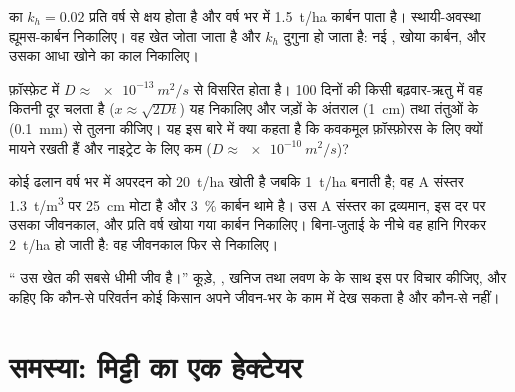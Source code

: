 \begin{exercise}[$\star\star$]\label{exo:b2:living-soil:9}
 का  $k_h = 0.02$ प्रति वर्ष से क्षय होता है और वर्ष भर में
\qty{1.5}{t/ha} कार्बन पाता है। स्थायी-अवस्था
ह्यूमस-कार्बन निकालिए। वह खेत जोता जाता है और $k_h$ दुगुना हो जाता है: नई
, खोया कार्बन, और उसका आधा खोने का काल निकालिए।
\end{exercise}

\begin{exercise}[$\star\star\star$]\label{exo:b2:living-soil:10}
फ़ॉस्फ़ेट  में $D \approx \qty{e-13}{m^2/s}$ से विसरित होता है।
\num{100} दिनों की किसी बढ़वार-ऋतु में वह कितनी दूर चलता है
($x \approx \sqrt{2Dt}$) यह निकालिए और जड़ों के अंतराल
(\qty{1}{cm}) तथा तंतुओं के (\qty{0.1}{mm}) से तुलना कीजिए। यह इस बारे में क्या कहता है
कि कवकमूल फ़ॉस्फ़ोरस के लिए क्यों मायने रखती हैं और नाइट्रेट के लिए कम
($D \approx \qty{e-10}{m^2/s}$)?
\end{exercise}

\begin{exercise}[$\star\star\star$]\label{exo:b2:living-soil:11}
कोई ढलान वर्ष भर में अपरदन को \qty{20}{t/ha}  खोती है जबकि
\qty{1}{t/ha} बनाती है; वह A संस्तर \qty{1.3}{t/m^3} पर \qty{25}{cm} मोटा है
और \qty{3}{\%} कार्बन थामे है। उस A
संस्तर का द्रव्यमान, इस दर पर उसका जीवनकाल, और प्रति वर्ष खोया गया
कार्बन निकालिए। बिना-जुताई के नीचे वह हानि गिरकर \qty{2}{t/ha} हो जाती है: वह
जीवनकाल फिर से निकालिए।
\end{exercise}

\begin{exercise}[$\star\star\star$]\label{exo:b2:living-soil:12}
`` उस खेत की सबसे धीमी जीव है।'' कूड़े, , खनिज 
तथा लवण के  के साथ इस पर विचार कीजिए, और कहिए कि
कौन-से परिवर्तन कोई किसान अपने जीवन-भर के काम में देख सकता है और कौन-से नहीं।
\end{exercise}

\section{समस्या: मिट्टी का एक हेक्टेयर}

